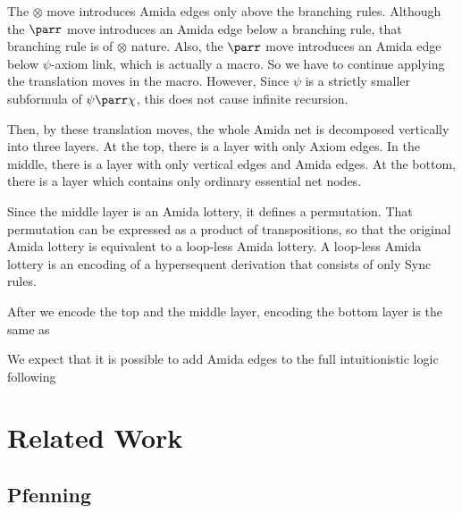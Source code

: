 The $\otimes$ move introduces Amida edges only above the branching rules.
Although the $\parr$ move introduces an Amida edge below a
branching rule, that branching rule is of $\otimes$ nature.
Also, the $\parr$ move introduces an Amida edge below $\psi$-axiom link,
which is actually a macro.  So we have to continue applying the
translation moves in the macro.  However, Since $\psi$ is a strictly
smaller subformula of $\psi\parr\chi$, this does not cause infinite
recursion.

Then, by these translation moves,
the whole Amida net is decomposed vertically into three layers.
At the top, there is a layer with only Axiom edges.
In the middle, there is a layer with only vertical edges and Amida
edges.
At the bottom, there is a layer which contains only ordinary
essential net nodes.

Since the middle layer is an Amida lottery, it defines a permutation.
That permutation can be expressed as a product of transpositions, so
that
the original Amida lottery is equivalent to a loop-less Amida lottery.
A loop-less Amida lottery is an encoding of a hypersequent derivation
that consists of only Sync rules.

After we encode the top and the middle layer, encoding the bottom layer
is the same as 


We expect that it is possible to add Amida edges to
the full intuitionistic logic following
\citet{groote1999}


\section{Related Work}

\subsection{Pfenning}


